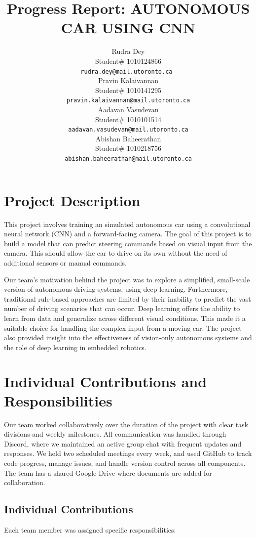 \documentclass{article} %
\title{Progress Report: AUTONOMOUS CAR USING CNN\\}
\author{Rudra Dey  \\
Student\# 1010124866\\
\texttt{rudra.dey@mail.utoronto.ca } \\
\And
Pravin Kalaivannan  \\
Student\# 1010141295 \\ 
\texttt{pravin.kalaivannan@mail.utoronto.ca} \\
\AND
Aadavan Vasudevan  \\
Student\# 1010101514 \\
\texttt{aadavan.vasudevan@mail.utoronto.ca} \\
\And
Abishan Baheerathan \\
Student\# 1010218756 \\
\texttt{abishan.baheerathan@mail.utoronto.ca} \\
\AND
}
\begin{document}
\maketitle


\section{Project Description}

This project involves training an simulated autonomous car using a convolutional neural network (CNN) and a forward-facing camera. The goal of this project is to build a model that can predict steering commands based on visual input from the camera. This should allow the car to drive on its own without the need of additional sensors or manual commands.  

Our team’s motivation behind the project was to explore a simplified, small-scale version of autonomous driving systems, using deep learning. Furthermore, traditional rule-based approaches are limited by their inability to predict the vast number of driving scenarios that can occur. Deep learning offers the ability to learn from data and generalize across different visual conditions. This made it a suitable choice for handling the complex input from a moving car. The project also provided insight into the effectiveness of vision-only autonomous systems and the role of deep learning in embedded robotics.


\section{Individual Contributions and Responsibilities}

Our team worked collaboratively over the duration of the project with clear task divisions and weekly milestones. All communication was handled through Discord, where we maintained an active group chat with frequent updates and responses. We held two scheduled meetings every week, and used GitHub to track code progress, manage issues, and handle version control across all components. The team has a shared Google Drive where documents are added for collaboration. 


\subsection{Individual Contributions}
Each team member was assigned specific responsibilities:
\end{document}
